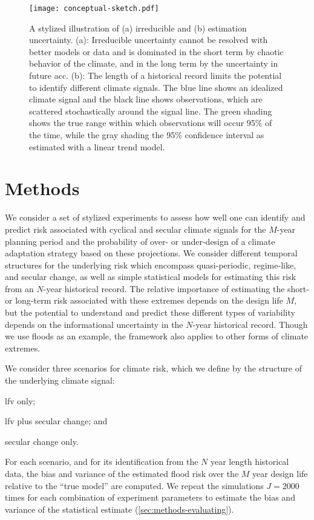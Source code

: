 \documentclass[
]{agujournal2018}
\begin{document}
\begin{figure}
  \centering
  \texttt{[image: conceptual-sketch.pdf]}
  \caption{
    A stylized illustration of (a) irreducible and (b) estimation uncertainty.
    (a): Irreducible uncertainty cannot be resolved with better models or data and is dominated in the short term by chaotic behavior of the climate, and in the long term by the uncertainty in future \acrlong{acc}.
    (b): The length of a historical record limits the potential to identify different climate signals.
    The blue line shows an idealized climate signal and the black line shows observations, which are scattered stochastically around the signal line.
    The green shading shows the true range within which observations will occur 95\% of the time, while the gray shading the 95\% confidence interval as estimated with a linear trend model.
    }\label{fig:conceptual-sketch}
\end{figure}


\section{Methods}\label{sec:methods}

We consider a set of stylized experiments to assess how well one can identify and predict risk associated with cyclical and secular climate signals for the $M$-year planning period and the probability of over- or under-design of a climate adaptation strategy based on these projections.
We consider different temporal structures for the underlying risk which encompass quasi-periodic, regime-like, and secular change, as well as simple statistical models for estimating this risk from an $N$-year historical record.
The relative importance of estimating the short- or long-term risk associated with these extremes depends on the design life $M$, but the potential to understand and predict these different types of variability depends on the informational uncertainty in the $N$-year historical record.
Though we use floods as an example, the framework also applies to other forms of climate extremes.

We consider three scenarios for climate risk, which we define by the structure of the underlying climate signal:
\begin{enumerate*}[label= (\roman*)]
  \item \gls{lfv} only;
  \item \gls{lfv} plus secular change; and
  \item secular change only.
\end{enumerate*}
For each scenario, and for its identification from the $N$ year length historical data, the bias and variance of the estimated flood risk over the $M$ year design life relative to the ``true model'' are computed.
We repeat the simulations $J = 2000$ times for each combination of experiment parameters to estimate the bias and variance of the statistical estimate (\cref{sec:methods-evaluating}).
\end{document}
